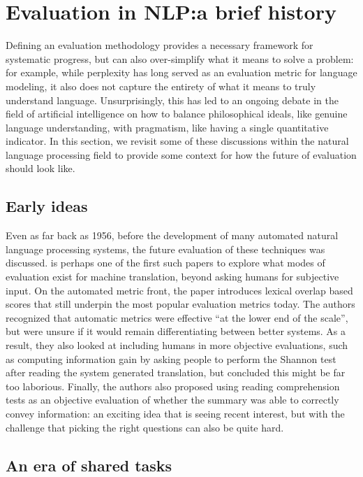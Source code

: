 \section{\label{sec:setup:history}Evaluation in NLP:\@ a brief history}

Defining an evaluation methodology provides a necessary framework for systematic progress, but can also over-simplify what it means to solve a problem: for example, while perplexity has long served as an evaluation metric for language modeling, it also does not capture the entirety of what it means to truly understand language.
Unsurprisingly, this has led to an ongoing debate in the field of artificial intelligence on how to balance philosophical ideals, like genuine language understanding, with pragmatism, like having a single quantitative indicator.
In this section, we revisit some of these discussions within the natural language processing field to provide some context for how the future of evaluation should look like.

\subsection{Early ideas}

Even as far back as 1956, before the development of many automated natural language processing systems, the future evaluation of these techniques was discussed.
\citet{miller1956psychological} is perhaps one of the first such papers to explore what modes of evaluation exist for machine translation, beyond asking humans for subjective input.
On the automated metric front, the paper introduces lexical overlap based scores that still underpin the most popular evaluation metrics today.
The authors recognized that automatic metrics were effective ``at the lower end of the scale'', but were unsure if it would remain differentiating between better systems.
As a result, they also looked at including humans in more objective evaluations, such as computing information gain by asking people to perform the Shannon test after reading the system generated translation, but concluded this might be far too laborious.
Finally, the authors also proposed using reading comprehension tests as an objective evaluation of whether the summary was able to correctly convey information: an exciting idea that is seeing recent interest, but with the challenge that picking the right questions can also be quite hard.

\subsection{An era of shared tasks}

